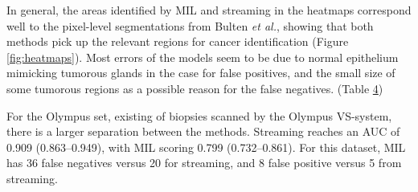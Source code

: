 \documentclass[
  12pt,
  a5,margin=2cmpaper,
]{article}
\begin{document}
In general, the areas identified by MIL and streaming in the heatmaps
correspond well to the pixel-level segmentations from Bulten \emph{et
al.}, showing that both methods pick up the relevant regions for cancer
identification (Figure
\protect\hyperlink{fig:heatmaps}{{[}fig:heatmaps{]}}). Most errors of
the models seem to be due to normal epithelium mimicking tumorous glands
in the case for false positives, and the small size of some tumorous
regions as a possible reason for the false negatives. (Table
\protect\hyperlink{tab:errors}{4})

For the Olympus set, existing of biopsies scanned by the Olympus
VS-system, there is a larger separation between the methods. Streaming
reaches an AUC of 0.909 (0.863--0.949), with MIL scoring 0.799
(0.732--0.861). For this dataset, MIL has 36 false negatives versus 20
for streaming, and 8 false positive versus 5 from streaming.
\end{document}
